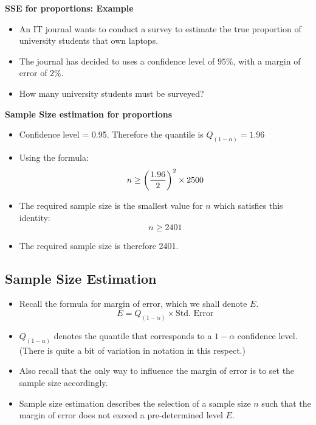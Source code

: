 \documentclass[]{report}
\begin{document}

\noindent \textbf{SSE for proportions: Example}
\begin{itemize}
\item An IT journal wants to conduct a survey to estimate the true proportion of university students that own laptops.
\item The journal has decided to uses a confidence level of $95\%$, with a margin of error of $2\%$.
\item How many university students must be surveyed?
\end{itemize}



\noindent \textbf{Sample Size estimation for proportions}

\begin{itemize}
\item Confidence level = 0.95. Therefore the quantile is $Q_{(1-\alpha)} = 1.96$
\item Using the formula: \[ n \geq \left({1.96 \over 2 }\right)^2 \times 2500  \]
\item The required sample size is the smallest value for $n$ which satisfies this identity: \[ n \geq 2401  \]
\item The required sample size is therefore 2401.
\end{itemize}



\newpage




\subsection{Sample Size Estimation}

\begin{itemize} \item Recall the formula for margin of error, which we shall denote $E$.
\[  E = Q_{(1-\alpha)} \times \mbox{Std. Error}\]

\item $Q_{(1-\alpha)}$ denotes the quantile that corresponds to a $1-\alpha$ confidence level. (There is quite a bit of variation in notation in this respect.)
\item Also recall that the only way to influence the margin of error is to set the sample size accordingly.

\item Sample size estimation describes the selection of a sample size $n$ such that the margin of error does not exceed a pre-determined level $E$.
\end{itemize}
\end{document}
